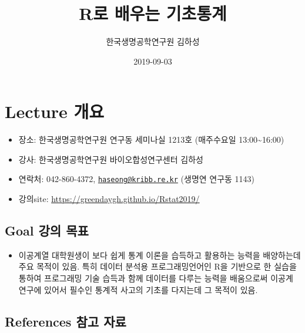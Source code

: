 \documentclass[]{book}
\title{R로 배우는 기초통계}
\author{한국생명공학연구원 김하성}
\date{2019-09-03}
\providecommand{\tightlist}{%
  \setlength{\itemsep}{0pt}\setlength{\parskip}{0pt}}
\begin{document}
\maketitle

{
\setcounter{tocdepth}{1}
\tableofcontents
}
\hypertarget{lecture-}{%
\chapter{Lecture 개요}\label{lecture-}}

\begin{itemize}
\tightlist
\item
  장소: 한국생명공학연구원 연구동 세미나실 1213호 (매주수요일 13:00\textasciitilde{}16:00)
\item
  강사: 한국생명공학연구원 바이오합성연구센터 김하성
\item
  연락처: 042-860-4372, \href{mailto:haseong@kribb.re.kr}{\nolinkurl{haseong@kribb.re.kr}} (생명연 연구동 1143)
\item
  강의site: \url{https://greendaygh.github.io/Rstat2019/}
\end{itemize}

\hypertarget{goal--}{%
\section{Goal 강의 목표}\label{goal--}}

\begin{itemize}
\tightlist
\item
  이공계열 대학원생이 보다 쉽게 통계 이론을 습득하고 활용하는 능력을 배양하는데 주요 목적이 있음. 특히 데이터 분석용 프로그래밍언어인 R을 기반으로 한 실습을 통하여 프로그래밍 기술 습득과 함께 데이터를 다루는 능력을 배움으로써 이공계 연구에 있어서 필수인 통계적 사고의 기초를 다지는데 그 목적이 있음.
\end{itemize}

\hypertarget{references--}{%
\section{References 참고 자료}\label{references--}}
\end{document}

